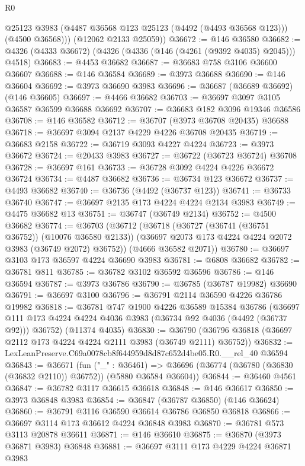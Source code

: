 \begin{lexlean}{R0}
\begin{coremodule}
          @25123
          @3983
          (@4487 @36568 @123 @25123 (@4492 (@4493 @36568 @123)))
          (@4500 @36568)))
      (@12062 @2133 @25059))
@36672 := @146 @36580
@36682 := @4326 (@4333 @36672) (@4326 (@4336 (@146 (@4261 (@9392 @4035) @2045))) @4518)
@36683 := @4453 @36682
@36687 := @36683 @758 @3106 @36600 @36607
@36688 := @146 @36584
@36689 := @3973 @36688
@36690 := @146 @36604
@36692 := @3973 @36690 @3983
@36696 := @36687 (@36689 @36692) (@146 @36605)
@36697 := @4466 @36682
@36703 := @36697 @3097 @3105 @36587 @36599 @36688 @36692
@36707 := @36683 @182 @3096 @19346 @36586
@36708 := @146 @36582
@36712 := @36707 (@3973 @36708 @20435) @36688
@36718 := @36697 @3094 @2137 @4229 @4226 @36708 @20435
@36719 := @36683 @2158
@36722 := @36719 @3093 @4227 @4224
@36723 := @3973 @36672
@36724 := @20433 @3983
@36727 := @36722 (@36723 @36724) @36708
@36728 := @36697 @161
@36733 := @36728 @3092 @4224 @4226 @36672 @36724
@36734 := @4487 @36682
@36736 := @36734 @123 @36672
@36737 := @4493 @36682
@36740 := @36736 (@4492 (@36737 @123))
@36741 := @36733 @36740
@36747 := @36697 @2135 @173 @4224 @4224 @2134 @3983
@36749 := @4475 @36682 @13
@36751 := @36747 (@36749 @2134)
@36752 := @4500 @36682
@36774 := @36703
    (@36712
      (@36718
        (@36727 (@36741 (@36751 @36752)) (@10076 @36580 @2133))
        (@36697 @2073 @173 @4224 @4224 @2072 @3983 (@36749 @2072) @36752))
      (@4666 @36582 @2071))
@36780 := @36697 @3103 @173 @36597 @4224 @36690 @3983
@36781 := @6808 @36682
@36782 := @36781 @811
@36785 := @36782 @3102 @36592 @36596
@36786 := @146 @36594
@36787 := @3973 @36786
@36790 := @36785 (@36787 @19982) @36690
@36791 := @36697 @3100
@36796 := @36791 @2114 @36590 @4226 @36786 @19982
@36818 := @36781
    @747
    @1900
    @4226
    @36589
    @15384
    @36786
    (@36697 @111 @173 @4224 @4224 @4036 @3983 (@36734 @92 @4036 (@4492 (@36737 @92))) @36752)
    (@11374 @4035)
@36830 := @36790 (@36796 @36818 (@36697 @2112 @173 @4224 @4224 @2111 @3983 (@36749 @2111) @36752))
@36832 := LexLeanPreserve.C69a0078cb8f644959d8d87c652d4be05.R0.__rel_40 @36594
@36843 := @36671
    (fun ("_" : @36461) =>
    @36696 (@36774 (@36780 (@36830 (@36832 @2110)) @36752)) (@5880 @36584 @36604))
@36844 := @36460 @4561
@36847 := @36782 @3117 @36615 @36618
@36848 := @146 @36617
@36850 := @3973 @36848 @3983
@36854 := @36847 (@36787 @36850) (@146 @36624)
@36860 := @36791 @3116 @36590 @36614 @36786 @36850 @36818
@36866 := @36697 @3114 @173 @36612 @4224 @36848 @3983
@36870 := @36781 @573 @3113 @20878 @36611
@36871 := @146 @36610
@36875 := @36870 (@3973 @36871 @3983) @36848
@36881 := @36697 @3111 @173 @4229 @4224 @36871 @3983

\end{coremodule}
\end{lexlean}
